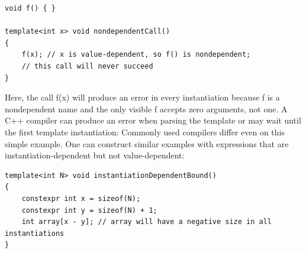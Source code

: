 \begin{lstlisting}[style=styleCXX]
void f() { }

template<int x> void nondependentCall()
{
	f(x); // x is value-dependent, so f() is nondependent;
	// this call will never succeed
}
\end{lstlisting}

Here, the call f(x) will produce an error in every instantiation because f is a nondependent name and the only visible f accepts zero arguments, not one. A C++ compiler can produce an error when parsing the template or may wait until the first template instantiation: Commonly used compilers differ even on this simple example. One can construct similar examples with expressions that are instantiation-dependent but not value-dependent:

\begin{lstlisting}[style=styleCXX]
template<int N> void instantiationDependentBound()
{
	constexpr int x = sizeof(N);
	constexpr int y = sizeof(N) + 1;
	int array[x - y]; // array will have a negative size in all instantiations
}
\end{lstlisting}











